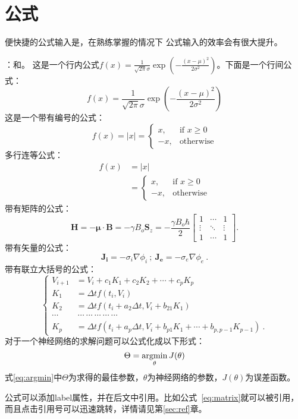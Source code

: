 \section{公式}

便快捷的公式输入是，在熟练掌握的情况下
公式输入的效率会有很大提升。

：和。
这是一个行内公式$f(x) = \frac{1}{\sqrt{2\pi}\sigma}\exp{(-\frac{(x-\mu)^2}{2\sigma^2})}$。下面是一个行间公式：
$$
f(x) = \frac{1}{\sqrt{2\pi}\sigma}\exp{(-\frac{(x-\mu)^2}{2\sigma^2})}
$$
这是一个带有编号的公式：
\begin{equation}
	f(x)= |x| = 
	\begin{cases}
		x,& \text{if } x\geq 0\\
		-x,              & \text{otherwise}
	\end{cases}
	\label{eq:cases}
\end{equation}
多行连等公式：
\begin{equation}
	\begin{split}
		f(x) &= |x| \\
		&= \begin{cases}
			x,& \text{if } x\geq 0\\
			-x,              & \text{otherwise}
		\end{cases}
	\end{split}
\end{equation}
带有矩阵的公式：
\begin{equation}
	\mathbf{H} = -\mathbf\mu \cdot \mathbf{B} = -\gamma B_o \mathbf{S}_z = -\frac{\gamma B_o\hbar}{2} 
	\begin{bmatrix}
		1& \cdots &1\\ 
		\vdots & \ddots & \vdots \\
		1 & \cdots & 1 
	\end{bmatrix}.
	\label{eq:matrix}
\end{equation}
带有矢量的公式：%
\begin{equation}
	\label{eq:current_density_inandout}
	\bm{J_i} = -\sigma_i \nabla \phi_i ~;~ \bm{J_e}= -\sigma_e \nabla \phi_e ~.
\end{equation}
带有联立大括号的公式：%
\begin{equation}
	\label{eq:runge_p_eq}
	\left\lbrace
	\begin{aligned}
		V_{i+1} &= V_i + c_1 K_1 + c_2 K_2 + \cdots + c_p K_p \\
		K_1 &= \Delta t f(t_i ,V_i) \\
		K_2 &= \Delta t f\left(t_i + a_2 \Delta t, V_i + b_{21} K_1\right) \\
		\cdots&~\cdots~\cdots~\cdots~\cdots~\cdots \\
		K_p &= \Delta t f\left( t_i + a_p \Delta t, V_i + b_{p1} K_1 + \cdots + b_{p,p-1} K_{p-1}\right) ~.
	\end{aligned}
	\right.
\end{equation}
对于一个神经网络的求解问题可以公式化成以下形式：
\begin{equation}
	\Theta = \mathop{\mathrm{argmin}}\limits_{\theta} J(\theta)
	\label{eq:argmin}
\end{equation}
式\ref{eq:argmin}中$\Theta$为求得的最佳参数，$\theta$为神经网络的参数，$J(\theta)$为误差函数。

公式可以添加label属性，并在后文中引用。比如公式~\ref{eq:matrix}就可以被引用，
而且点击引用号可以迅速跳转，详情请见第\ref{sec:ref}章。
